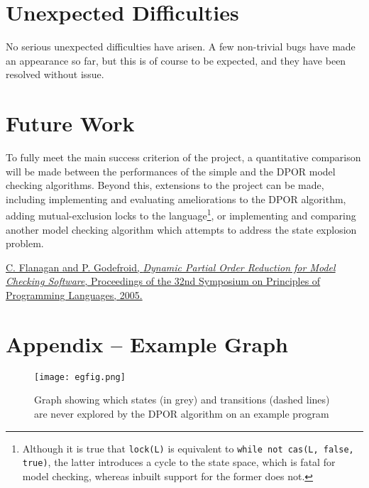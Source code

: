 \documentclass[12pt,a4paper,twoside]{article}
\begin{document}
\section*{Unexpected Difficulties}

No serious unexpected difficulties have arisen. A few non-trivial bugs
have made an appearance so far, but this is of course to be expected,
and they have been resolved without issue.

\section*{Future Work}

To fully meet the main success criterion of the project, a quantitative
comparison will be made between the performances of the simple and the DPOR
model checking algorithms. Beyond this, extensions to the project can be
made, including implementing and evaluating ameliorations to the DPOR
algorithm, adding
mutual-exclusion locks to the language\footnote{Although it is true
	that \texttt{lock(L)} is equivalent to \texttt{while not cas(L, false, true)}, the latter introduces a cycle to the state space, which is fatal for model checking, whereas inbuilt support for the former
	does not.}, or implementing and comparing another model checking algorithm which attempts to address the state explosion problem.

\begin{thebibliography}{9}
	
	\href{https://users.soe.ucsc.edu/~cormac/papers/popl05.pdf}{
		C. Flanagan and P. Godefroid,
		\emph{Dynamic Partial Order Reduction
			for Model Checking Software},
		Proceedings of the 32nd Symposium on Principles of Programming Languages,
		2005.
	}

\end{thebibliography}

\appendix

\section*{Appendix -- Example Graph}

\begin{figure}[tbh]
	\centerline{\texttt{[image: egfig.png]}}
	\caption{Graph showing which states (in grey) and transitions
		(dashed lines) are never explored by the DPOR algorithm
		on an example program}

\end{figure}
\end{document}
